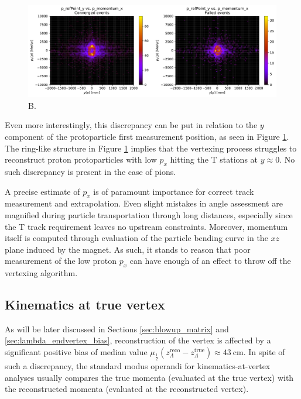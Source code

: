 \begin{figure}[t]
	\centering
	\includegraphics[width=\textwidth]{graphics/03-vertex_reconstruction/pp_p_refPoint_y_vs_p_momentum_x.pdf}
	\caption{B.}
	\label{fig:pp_p_px_vs_refpy_conv_vs_failed}
\end{figure}

Even more interestingly, this discrepancy can be put in relation to the $y$ component of the protoparticle first measurement position, as seen in Figure \ref{fig:pp_p_px_vs_refpy_conv_vs_failed}.
The ring-like structure in Figure \ref{fig:pp_p_px_vs_refpy_conv_vs_failed} implies that the vertexing process struggles to reconstruct proton protoparticles with low $p_x$ hitting the T stations at $y\approx 0$.
No such discrepancy is present in the case of pions.

A precise estimate of $p_x$ is of paramount importance for correct track measurement and extrapolation.
Even slight mistakes in angle assessment are magnified during particle transportation through long distances, especially since the T track requirement leaves no upstream constraints.
Moreover, momentum itself is computed through evaluation of the particle bending curve in the $xz$ plane induced by the magnet.
As such, it stands to reason that poor measurement of the low proton $p_x$ can have enough of an effect to throw off the vertexing algorithm.

\subsection{Kinematics at true vertex}
\label{sec:3:true_vtx_kinematics}
As will be later discussed in Sections \ref{sec:blowup_matrix} and \ref{sec:lambda_endvertex_bias}, reconstruction of the \lz vertex is affected by a significant positive bias of median value $\mu_\frac{1}{2} \left(z_\Lambda^\text{reco} - z_\Lambda^\text{true}\right) \approx \SI{43}{\centi\meter}$.
In spite of such a discrepancy, the standard modus operandi for kinematics-at-vertex analyses usually compares the true momenta (evaluated at the true vertex) with the reconstructed momenta (evaluated at the reconstructed vertex).

